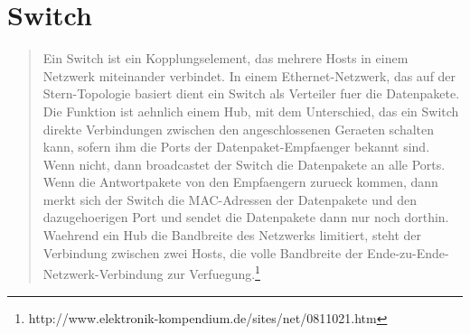\documentclass[a4paper]{report}
\begin{document}
\section{Switch}
\begin{quote}
Ein Switch ist ein Kopplungselement, das mehrere Hosts in einem Netzwerk miteinander verbindet. In einem Ethernet-Netzwerk, das auf der Stern-Topologie basiert dient ein Switch als Verteiler fuer die Datenpakete.
Die Funktion ist aehnlich einem Hub, mit dem Unterschied, das ein Switch direkte Verbindungen zwischen den angeschlossenen Geraeten schalten kann, sofern ihm die Ports der Datenpaket-Empfaenger bekannt sind. Wenn nicht, dann broadcastet der Switch die Datenpakete an alle Ports. Wenn die Antwortpakete von den Empfaengern zurueck kommen, dann merkt sich der Switch die MAC-Adressen der Datenpakete und den dazugehoerigen Port und sendet die Datenpakete dann nur noch dorthin.
Waehrend ein Hub die Bandbreite des Netzwerks limitiert, steht der Verbindung zwischen zwei Hosts, die volle Bandbreite der Ende-zu-Ende-Netzwerk-Verbindung zur Verfuegung.\footnote{http://www.elektronik-kompendium.de/sites/net/0811021.htm}
\end{quote}
\end{document}
